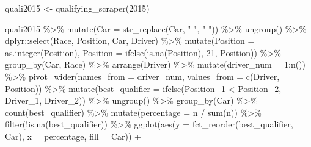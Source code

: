 \documentclass[
]{book}
\newenvironment{Shaded}{\begin{snugshade}}{\end{snugshade}}
\newcommand{\AttributeTok}[1]{\textcolor[rgb]{0.77,0.63,0.00}{#1}}
\newcommand{\DecValTok}[1]{\textcolor[rgb]{0.00,0.00,0.81}{#1}}
\newcommand{\FunctionTok}[1]{\textcolor[rgb]{0.00,0.00,0.00}{#1}}
\newcommand{\NormalTok}[1]{#1}
\newcommand{\OtherTok}[1]{\textcolor[rgb]{0.56,0.35,0.01}{#1}}
\newcommand{\SpecialCharTok}[1]{\textcolor[rgb]{0.00,0.00,0.00}{#1}}
\newcommand{\StringTok}[1]{\textcolor[rgb]{0.31,0.60,0.02}{#1}}
\begin{document}
\begin{Shaded}
\begin{Highlighting}[]
\NormalTok{quali2015 }\OtherTok{\textless{}{-}} \FunctionTok{qualifying\_scraper}\NormalTok{(}\DecValTok{2015}\NormalTok{)}

\NormalTok{quali2015 }\SpecialCharTok{\%\textgreater{}\%}
  \FunctionTok{mutate}\NormalTok{(}\AttributeTok{Car =} \FunctionTok{str\_replace}\NormalTok{(Car, }\StringTok{"{-}"}\NormalTok{, }\StringTok{" "}\NormalTok{)) }\SpecialCharTok{\%\textgreater{}\%} 
  \FunctionTok{ungroup}\NormalTok{() }\SpecialCharTok{\%\textgreater{}\%}
\NormalTok{  dplyr}\SpecialCharTok{::}\FunctionTok{select}\NormalTok{(Race, Position, Car, Driver) }\SpecialCharTok{\%\textgreater{}\%}
  \FunctionTok{mutate}\NormalTok{(}\AttributeTok{Position =} \FunctionTok{as.integer}\NormalTok{(Position),}
         \AttributeTok{Position =} \FunctionTok{ifelse}\NormalTok{(}\FunctionTok{is.na}\NormalTok{(Position), }\DecValTok{21}\NormalTok{, Position)) }\SpecialCharTok{\%\textgreater{}\%} 
  \FunctionTok{group\_by}\NormalTok{(Car, Race) }\SpecialCharTok{\%\textgreater{}\%} 
  \FunctionTok{arrange}\NormalTok{(Driver) }\SpecialCharTok{\%\textgreater{}\%} 
  \FunctionTok{mutate}\NormalTok{(}\AttributeTok{driver\_num =} \DecValTok{1}\SpecialCharTok{:}\FunctionTok{n}\NormalTok{()) }\SpecialCharTok{\%\textgreater{}\%} 
  \FunctionTok{pivot\_wider}\NormalTok{(}\AttributeTok{names\_from =} \StringTok{\textquotesingle{}driver\_num\textquotesingle{}}\NormalTok{, }\AttributeTok{values\_from =} \FunctionTok{c}\NormalTok{(}\StringTok{\textquotesingle{}Driver\textquotesingle{}}\NormalTok{, }\StringTok{\textquotesingle{}Position\textquotesingle{}}\NormalTok{)) }\SpecialCharTok{\%\textgreater{}\%}
  \FunctionTok{mutate}\NormalTok{(}\AttributeTok{best\_qualifier =} \FunctionTok{ifelse}\NormalTok{(Position\_1 }\SpecialCharTok{\textless{}}\NormalTok{ Position\_2, Driver\_1, Driver\_2)) }\SpecialCharTok{\%\textgreater{}\%}
  \FunctionTok{ungroup}\NormalTok{() }\SpecialCharTok{\%\textgreater{}\%}
  \FunctionTok{group\_by}\NormalTok{(Car) }\SpecialCharTok{\%\textgreater{}\%}
  \FunctionTok{count}\NormalTok{(best\_qualifier) }\SpecialCharTok{\%\textgreater{}\%}
  \FunctionTok{mutate}\NormalTok{(}\AttributeTok{percentage =}\NormalTok{ n }\SpecialCharTok{/} \FunctionTok{sum}\NormalTok{(n)) }\SpecialCharTok{\%\textgreater{}\%}
  \FunctionTok{filter}\NormalTok{(}\SpecialCharTok{!}\FunctionTok{is.na}\NormalTok{(best\_qualifier)) }\SpecialCharTok{\%\textgreater{}\%}
  \FunctionTok{ggplot}\NormalTok{(}\FunctionTok{aes}\NormalTok{(}\AttributeTok{y =} \FunctionTok{fct\_reorder}\NormalTok{(best\_qualifier, Car), }\AttributeTok{x =}\NormalTok{ percentage, }\AttributeTok{fill =}\NormalTok{ Car)) }\SpecialCharTok{+}

\end{Highlighting}
\end{Shaded}
\end{document}
